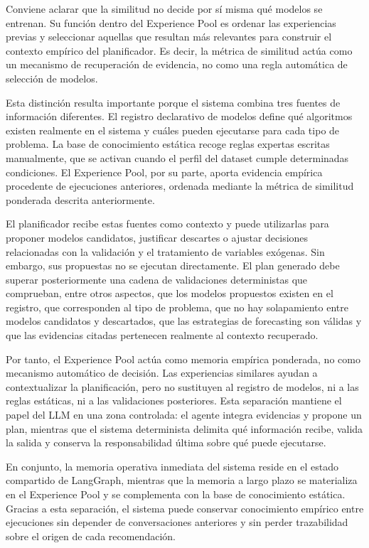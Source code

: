 \documentclass[12pt,a4paper]{article}
\theoremstyle{plain}
\begin{document}
Conviene aclarar que la similitud no decide por sí misma qué modelos se entrenan. Su función dentro del Experience Pool es ordenar las experiencias previas y seleccionar aquellas que resultan más relevantes para construir el contexto empírico del planificador. Es decir, la métrica de similitud actúa como un mecanismo de recuperación de evidencia, no como una regla automática de selección de modelos.

Esta distinción resulta importante porque el sistema combina tres fuentes de información diferentes. El registro declarativo de modelos define qué algoritmos existen realmente en el sistema y cuáles pueden ejecutarse para cada tipo de problema. La base de conocimiento estática recoge reglas expertas escritas manualmente, que se activan cuando el perfil del dataset cumple determinadas condiciones. El Experience Pool, por su parte, aporta evidencia empírica procedente de ejecuciones anteriores, ordenada mediante la métrica de similitud ponderada descrita anteriormente.

El planificador recibe estas fuentes como contexto y puede utilizarlas para proponer modelos candidatos, justificar descartes o ajustar decisiones relacionadas con la validación y el tratamiento de variables exógenas. Sin embargo, sus propuestas no se ejecutan directamente. El plan generado debe superar posteriormente una cadena de validaciones deterministas que comprueban, entre otros aspectos, que los modelos propuestos existen en el registro, que corresponden al tipo de problema, que no hay solapamiento entre modelos candidatos y descartados, que las estrategias de forecasting son válidas y que las evidencias citadas pertenecen realmente al contexto recuperado.

Por tanto, el Experience Pool actúa como memoria empírica ponderada, no como mecanismo automático de decisión. Las experiencias similares ayudan a contextualizar la planificación, pero no sustituyen al registro de modelos, ni a las reglas estáticas, ni a las validaciones posteriores. Esta separación mantiene el papel del LLM en una zona controlada: el agente integra evidencias y propone un plan, mientras que el sistema determinista delimita qué información recibe, valida la salida y conserva la responsabilidad última sobre qué puede ejecutarse.

En conjunto, la memoria operativa inmediata del sistema reside en el estado compartido de LangGraph, mientras que la memoria a largo plazo se materializa en el Experience Pool y se complementa con la base de conocimiento estática. Gracias a esta separación, el sistema puede conservar conocimiento empírico entre ejecuciones sin depender de conversaciones anteriores y sin perder trazabilidad sobre el origen de cada recomendación.
\end{document}
